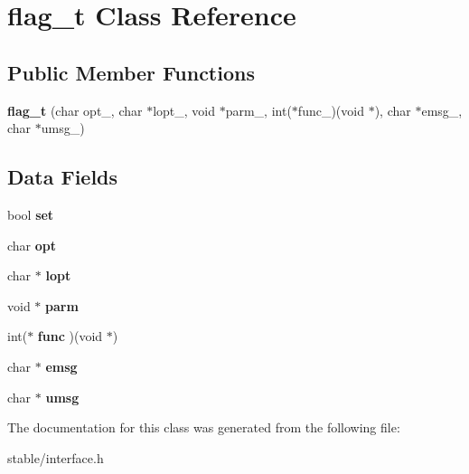 \hypertarget{classflag__t}{\section{flag\-\_\-t Class Reference}
\label{classflag__t}
}
\subsection*{Public Member Functions}
\begin{DoxyCompactItemize}
\item 
\hypertarget{classflag__t_a0fb866dc289c51d3cf31f8d2cc60c428}{{\bfseries flag\-\_\-t} (char opt\-\_\-, char $\ast$lopt\-\_\-, void $\ast$parm\-\_\-, int($\ast$func\-\_\-)(void $\ast$), char $\ast$emsg\-\_\-, char $\ast$umsg\-\_\-)}\label{classflag__t_a0fb866dc289c51d3cf31f8d2cc60c428}

\end{DoxyCompactItemize}
\subsection*{Data Fields}
\begin{DoxyCompactItemize}
\item 
\hypertarget{classflag__t_ad67f340df82fffbea1eef157ea00b6aa}{bool {\bfseries set}}\label{classflag__t_ad67f340df82fffbea1eef157ea00b6aa}

\item 
\hypertarget{classflag__t_abc7a5e5c09a1663833b54aea8df934d4}{char {\bfseries opt}}\label{classflag__t_abc7a5e5c09a1663833b54aea8df934d4}

\item 
\hypertarget{classflag__t_a28ca5f17d5c1765288359b060e1ef0f6}{char $\ast$ {\bfseries lopt}}\label{classflag__t_a28ca5f17d5c1765288359b060e1ef0f6}

\item 
\hypertarget{classflag__t_a5c61b009bf1d18cef797fd54291136fb}{void $\ast$ {\bfseries parm}}\label{classflag__t_a5c61b009bf1d18cef797fd54291136fb}

\item 
\hypertarget{classflag__t_a0df7aa844332aebaf5ccb68d889cd584}{int($\ast$ {\bfseries func} )(void $\ast$)}\label{classflag__t_a0df7aa844332aebaf5ccb68d889cd584}

\item 
\hypertarget{classflag__t_ad1efcb645ef5b3c0bf958c11b3867cb1}{char $\ast$ {\bfseries emsg}}\label{classflag__t_ad1efcb645ef5b3c0bf958c11b3867cb1}

\item 
\hypertarget{classflag__t_a046af852179fa30fef1536f38d65aa77}{char $\ast$ {\bfseries umsg}}\label{classflag__t_a046af852179fa30fef1536f38d65aa77}

\end{DoxyCompactItemize}


The documentation for this class was generated from the following file\-:\begin{DoxyCompactItemize}
\item 
stable/interface.\-h\end{DoxyCompactItemize}
